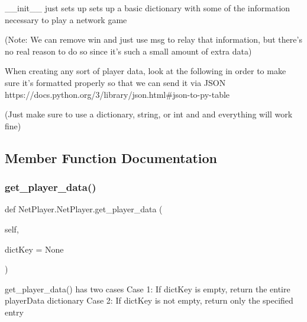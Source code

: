 \begin{DoxyVerb}__init__ just sets up sets up a basic dictionary with some of the
information necessary to play a network game

(Note: We can remove win and just use msg to relay that information,
but there's no real reason to do so since it's such a small amount of
extra data)
\end{DoxyVerb}
\begin{DoxyVerb}When creating any sort of player data, look at the following in order
to make sure it's formatted properly so that we can send it via JSON
https://docs.python.org/3/library/json.html#json-to-py-table

(Just make sure to use a dictionary, string, or int and and everything
will work fine)
\end{DoxyVerb}
 

\subsection{Member Function Documentation}
\mbox{\label{class_net_player_1_1_net_player_a01fafb3dac9097f8680d49306bc0d32a}} 
\subsubsection{\texorpdfstring{get\+\_\+player\+\_\+data()}{get\_player\_data()}}
{\footnotesize\ttfamily def Net\+Player.\+Net\+Player.\+get\+\_\+player\+\_\+data (\begin{DoxyParamCaption}\item[{}]{self,  }\item[{}]{dict\+Key = {\ttfamily None} }\end{DoxyParamCaption})}

\begin{DoxyVerb}get_player_data() has two cases
    Case 1: If dictKey is empty, return the entire playerData dictionary
    Case 2: If dictKey is not empty, return only the specified entry
\end{DoxyVerb}
 \mbox{\label{class_net_player_1_1_net_player_afd23b3ae945a572e87cb57fe0473916f}} 
